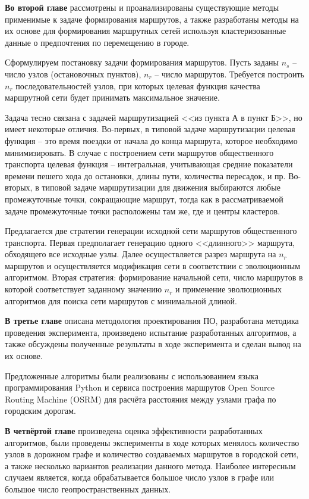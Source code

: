 \textbf{Во второй главе} рассмотрены и проанализированы существующие методы применимые к задаче формирования 
маршрутов, а также разработаны методы на их основе для формирования маршрутных сетей используя 
кластеризованные данные о предпочтения по перемещению в городе.

Сформулируем постановку задачи формирования маршрутов. Пусть заданы \( n_s \) -- число узлов (остановочных 
пунктов), \( n_r \) – число маршрутов. Требуется построить \( n_r \) последовательностей узлов, при которых 
целевая функция качества маршрутной сети будет принимать максимальное значение. 

Задача тесно связана с задачей маршрутизацией <<из пункта А в пункт Б>>, но имеет некоторые отличия. 
Во-первых, в типовой задаче маршрутизации целевая функция – это время поездки от начала до конца маршрута, 
которое необходимо минимизировать. В случае с построением сети маршрутов общественного транспорта целевая 
функция -- интегральная, учитывающая средние показатели времени пешего хода до остановки, длины пути, 
количества пересадок, и пр. Во-вторых, в типовой задаче маршрутизации для движения выбираются любые 
промежуточные точки, сокращающие маршрут, тогда как в рассматриваемой задаче промежуточные точки 
расположены там же, где и центры кластеров.

Предлагается две стратегии генерации исходной сети маршрутов общественного транспорта. Первая предполагает 
генерацию одного <<длинного>> маршрута, обходящего все исходные узлы. Далее осуществляется разрез маршрута 
на \( n_r \) маршрутов и осуществляется модификация сети в соответствии с эволюционным алгоритмом. Вторая 
стратегия: формирование начальной сети, число маршрутов в которой соответствует заданному значению \( n_r \) 
и применение эволюционных алгоритмов для поиска сети маршрутов с минимальной длиной.

\textbf{В третье главе} описана методология проектирования ПО, разработана методика проведения эксперимента, 
произведено испытание разработанных алгоритмов, а также обсуждены полученные результаты в ходе эксперимента 
и сделан вывод на их основе.

Предложенные алгоритмы были реализованы с использованием языка программирования Python и сервиса построения 
маршрутов Open Source Routing Machine (OSRM) для расчёта расстояния между узлами графа по городским дорогам.

\textbf{В четвёртой главе} произведена оценка эффективности разработанных алгоритмов, были проведены эксперименты в 
ходе которых менялось количество узлов в дорожном графе и количество создаваемых маршрутов в городской сети, а также 
несколько вариантов реализации данного метода. Наиболее интересным случаем является, когда обрабатывается большое 
число узлов в графе или большое число геопространственных данных.

